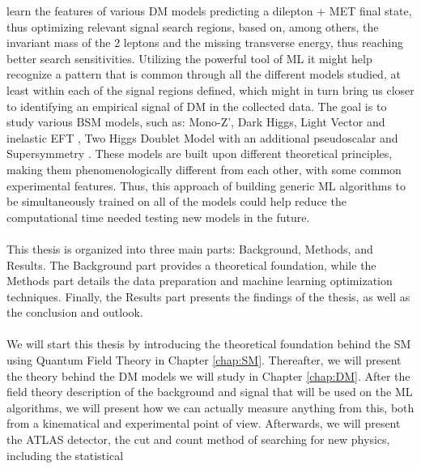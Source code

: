 \documentclass[12pt, a4paper]{book}
\begin{document}
learn the features of various DM models predicting a dilepton + MET final state, thus optimizing relevant signal search regions, based on, among others, the invariant mass of the 2 leptons and the missing transverse energy, thus reaching better search sensitivities. 
Utilizing the powerful tool of ML it might help recognize a pattern that is common through all the different models studied, at least within each of the signal regions defined, which might in turn bring us closer to identifying an empirical signal of DM in the collected data. 
The goal is to study various BSM models, such as: Mono-Z', Dark Higgs, Light Vector and inelastic EFT \cite{Zp_DM_candidate2}, Two Higgs Doublet Model with an additional pseudoscalar \cite{article} and Supersymmetry \cite{JUNGMAN1996195}. 
These models are built upon different theoretical principles, making them phenomenologically different from each other, with some common experimental features. Thus, this approach of building generic ML algorithms to be simultaneously trained on all of the models 
could help reduce the computational time needed testing new models in the future.\\
\\This thesis is organized into three main parts: Background, Methods, and Results. The Background part provides a theoretical foundation, while the Methods part details the data preparation and machine learning optimization techniques. 
Finally, the Results part presents the findings of the thesis, as well as the conclusion and outlook.\\
\\We will start this thesis by introducing the theoretical foundation behind the SM using Quantum Field Theory in Chapter \ref{chap:SM}. Thereafter, we will present the theory behind the DM models we will study in Chapter \ref{chap:DM}. After the field theory description of the background and signal that will be used 
on the ML algorithms, we will present how we can actually measure anything from this, both from a kinematical and experimental point of view. Afterwards, we will present the ATLAS detector, the cut and count method of searching for new physics, including the statistical 
\end{document}
